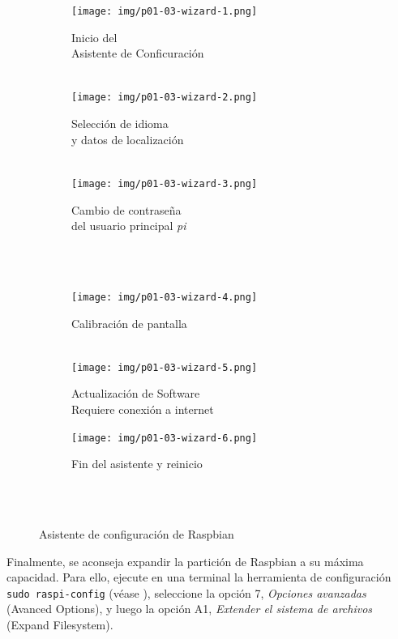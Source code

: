 \documentclass[letterpaper,10.5pt]{article}
\begin{document}
\begin{figure}[H]
	\centering%
	\begin{subfigure}[b]{0.33\linewidth}
		\centering
		\texttt{[image: img/p01-03-wizard-1.png]} %
		\caption{Inicio del\\Asistente de Conficuración\\~}
		\label{fig:setup-wizard-step-1} %
	\end{subfigure}%
	\begin{subfigure}[b]{0.33\linewidth}
		\centering
		\texttt{[image: img/p01-03-wizard-2.png]} %
		\caption{Selección de idioma\\y datos de localización\\~}
		\label{fig:setup-wizard-step-2} %
	\end{subfigure}%
	\begin{subfigure}[b]{0.33\linewidth}
		\centering
		\texttt{[image: img/p01-03-wizard-3.png]} %
		\caption{Cambio de contraseña\\del usuario principal \textit{pi}\\~}
		\label{fig:setup-wizard-step-3} %
	\end{subfigure}\\
	\begin{subfigure}[b]{0.33\linewidth}
		\centering
		\texttt{[image: img/p01-03-wizard-4.png]} %
		\caption{Calibración de pantalla\\~}
		\label{fig:setup-wizard-step-4} %
	\end{subfigure}%
	\begin{subfigure}[b]{0.33\linewidth}
		\centering
		\texttt{[image: img/p01-03-wizard-5.png]} %
		\caption{Actualización de Software\\Requiere conexión a internet}
		\label{fig:setup-wizard-step-5} %
	\end{subfigure}%
	\begin{subfigure}[b]{0.33\linewidth}
		\centering
		\texttt{[image: img/p01-03-wizard-6.png]} %
		\caption{Fin del asistente y reinicio\\~}
		\label{fig:setup-wizard-step-6} %
	\end{subfigure}\\
	\caption{Asistente de configuración de Raspbian}%
	\label{fig:setup-wizard} %
\end{figure}

Finalmente, se aconseja expandir la partición de Raspbian a su máxima capacidad.
Para ello, ejecute en una terminal la herramienta de configuración \texttt{sudo raspi-config} (véase ), seleccione la opción 7, \textit{Opciones avanzadas} (Avanced Options), y luego la opción A1, \textit{Extender el sistema de archivos} (Expand Filesystem).
\end{document}
